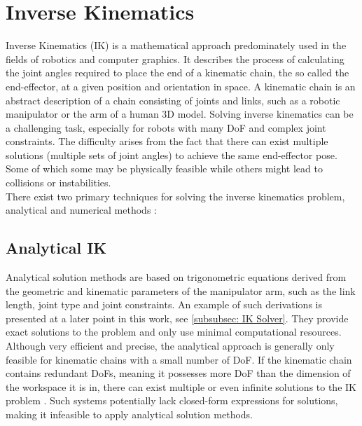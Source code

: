 

\section{Inverse Kinematics}
Inverse Kinematics (IK) is a mathematical approach predominately used in the fields of robotics and computer graphics.
It describes the process of calculating the joint angles required to place the end of a kinematic chain, the so called the end-effector, at a given position and orientation in space.
A kinematic chain is an abstract description of a chain consisting of joints and links, such as a robotic manipulator or the arm of a human 3D model.
Solving inverse kinematics can be a challenging task, especially for robots with many DoF and complex joint constraints.
The difficulty arises from the fact that there can exist multiple solutions (multiple sets of joint angles) to achieve the same end-effector pose.
Some of which some may be physically feasible while others might lead to collisions or instabilities.\\
There exist two primary techniques for solving the inverse kinematics problem, analytical and numerical methods \parencite{inverseKinematicsIllinois}:

\subsection{Analytical IK}
Analytical solution methods are based on trigonometric equations derived from the geometric and kinematic parameters of the manipulator arm, such as the link length, joint type and joint constraints.
An example of such derivations is presented at a later point in this work, see \ref{subsubsec: IK Solver}.
They provide exact solutions to the problem and only use minimal computational resources.
Although very efficient and precise, the analytical approach is generally only feasible for kinematic chains with a small number of DoF.
If the kinematic chain contains redundant DoFs, meaning it possesses more DoF than the dimension of the workspace it is in, there can exist multiple or even infinite solutions to the IK problem \parencite{inverseKinematicsIllinois}.
Such systems potentially lack closed-form expressions for solutions, making it infeasible to apply analytical solution methods.

